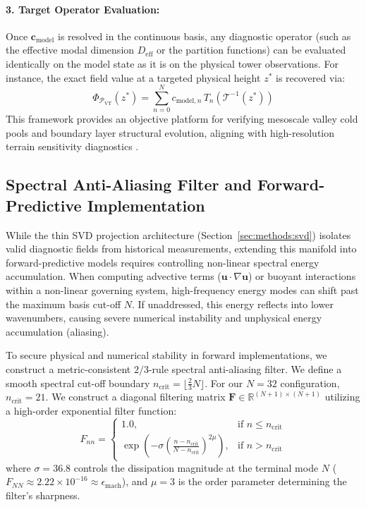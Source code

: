 \paragraph{3. Target Operator Evaluation:}
Once $\mathbf{c}_{\mathrm{model}}$ is resolved in the continuous basis, any diagnostic operator (such as the effective modal dimension $D_{\mathrm{eff}}$ or the partition functions) can be evaluated identically on the model state as it is on the physical tower observations. For instance, the exact field value at a targeted physical height $z^*$ is recovered via:
\begin{equation}
\Phi_{\mathcal{P}_{\mathrm{VT}}}(z^*) = \sum_{n=0}^{N} c_{\mathrm{model}, n} \, T_n\left( \mathcal{T}^{-1}(z^*) \right)
\label{eq:recovered_virtual_field}
\end{equation}
This framework provides an objective platform for verifying mesoscale valley cold pools and boundary layer structural evolution, aligning with high-resolution terrain sensitivity diagnostics \citep{Vosper2013, Sheridan2010}.

\subsection{Spectral Anti-Aliasing Filter and Forward-Predictive Implementation}
\label{sec:extensions:antialiasing}

While the thin SVD projection architecture (Section~\ref{sec:methods:svd}) isolates valid diagnostic fields from historical measurements, extending this manifold into forward-predictive models requires controlling non-linear spectral energy accumulation. When computing advective terms ($\mathbf{u} \cdot \nabla \mathbf{u}$) or buoyant interactions within a non-linear governing system, high-frequency energy modes can shift past the maximum basis cut-off $N$. If unaddressed, this energy reflects into lower wavenumbers, causing severe numerical instability and unphysical energy accumulation (aliasing).

To secure physical and numerical stability in forward implementations, we construct a metric-consistent $2/3$-rule spectral anti-aliasing filter. We define a smooth spectral cut-off boundary $n_{\mathrm{crit}} = \lfloor \frac{2}{3} N \rfloor$. For our $N=32$ configuration, $n_{\mathrm{crit}} = 21$. We construct a diagonal filtering matrix $\mathbf{F} \in \mathbb{R}^{(N+1) \times (N+1)}$ utilizing a high-order exponential filter function:
\begin{equation}
F_{nn} = \begin{cases}
1.0, & \text{if } n \le n_{\mathrm{crit}} \\
\exp\left( -\sigma \left( \frac{n - n_{\mathrm{crit}}}{N - n_{\mathrm{crit}}} \right)^{\! 2\mu} \right), & \text{if } n > n_{\mathrm{crit}}
\end{cases}
\label{eq:exponential_filter}
\end{equation}
where $\sigma = 36.8$ controls the dissipation magnitude at the terminal mode $N$ ($F_{NN} \approx 2.22 \times 10^{-16} \approx \epsilon_{\mathrm{mach}}$), and $\mu = 3$ is the order parameter determining the filter's sharpness.

